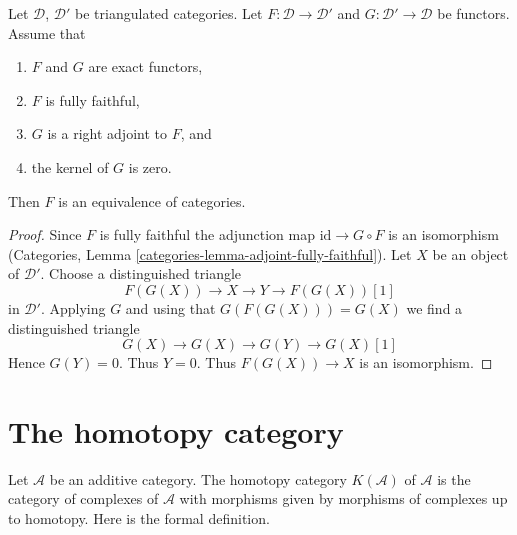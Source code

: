 \begin{lemma}
\label{lemma-fully-faithful-adjoint-kernel-zero}
Let $\mathcal{D}$, $\mathcal{D}'$ be triangulated categories.
Let $F : \mathcal{D} \to \mathcal{D}'$ and
$G : \mathcal{D}' \to \mathcal{D}$ be functors. Assume that
\begin{enumerate}
\item $F$ and $G$ are exact functors,
\item $F$ is fully faithful,
\item $G$ is a right adjoint to $F$, and
\item the kernel of $G$ is zero.
\end{enumerate}
Then $F$ is an equivalence of categories.
\end{lemma}

\begin{proof}
Since $F$ is fully faithful the adjunction map $\text{id} \to G \circ F$
is an isomorphism (Categories, Lemma
\ref{categories-lemma-adjoint-fully-faithful}).
Let $X$ be an object of $\mathcal{D}'$.
Choose a distinguished triangle
$$
F(G(X)) \to X \to Y \to F(G(X))[1]
$$
in $\mathcal{D}'$. Applying $G$ and using that $G(F(G(X))) = G(X)$
we find a distinguished triangle
$$
G(X) \to G(X) \to G(Y) \to G(X)[1]
$$
Hence $G(Y) = 0$. Thus $Y = 0$. Thus $F(G(X)) \to X$ is an isomorphism.
\end{proof}









\section{The homotopy category}
\label{section-homotopy}

\noindent
Let $\mathcal{A}$ be an additive category. The homotopy category
$K(\mathcal{A})$ of $\mathcal{A}$ is the category of complexes of
$\mathcal{A}$ with morphisms given by morphisms of complexes up to homotopy.
Here is the formal definition.


